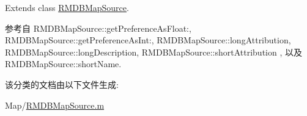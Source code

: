 Extends class \hyperlink{interface_r_m_d_b_map_source_a38e204b65e0108a40c9649639eee77a5}{R\-M\-D\-B\-Map\-Source}.



参考自 R\-M\-D\-B\-Map\-Source\-::get\-Preference\-As\-Float\-:, R\-M\-D\-B\-Map\-Source\-::get\-Preference\-As\-Int\-:, R\-M\-D\-B\-Map\-Source\-::long\-Attribution, R\-M\-D\-B\-Map\-Source\-::long\-Description, R\-M\-D\-B\-Map\-Source\-::short\-Attribution , 以及 R\-M\-D\-B\-Map\-Source\-::short\-Name.



该分类的文档由以下文件生成\-:\begin{DoxyCompactItemize}
\item 
Map/\hyperlink{_r_m_d_b_map_source_8m}{R\-M\-D\-B\-Map\-Source.\-m}\end{DoxyCompactItemize}
